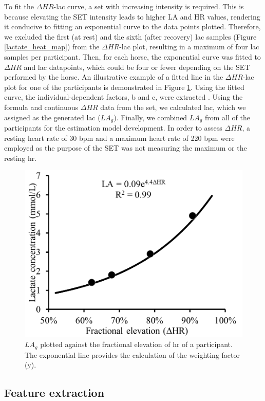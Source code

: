 To fit the $\Delta HR$-\gls{lac} curve, a \gls{set} with increasing intensity is required. This is because elevating the SET intensity leads to higher LA and HR values, rendering it conducive to fitting an exponential curve to the data points plotted. Therefore, we excluded the first (at rest) and the sixth (after recovery) \gls{lac} samples (Figure \ref{lactate_heat_map}) from the $\Delta HR$-\gls{lac} plot, resulting in a maximum of four \gls{lac} samples per participant. Then, for each horse, the exponential curve was fitted to $\Delta HR$ and \gls{lac} datapoints, which could be four or fewer depending on the SET performed by the horse. An illustrative example of a fitted line in the $\Delta HR$-\gls{lac} plot for one of the participants is demonstrated in Figure \ref{deltahr_LA_plot}. Using the fitted curve, the individual-dependent factors, b and c, were extracted \cite{Munsters2020AStudy}. Using the formula and continuous $\Delta HR$ data from the \gls{set}, we calculated \gls{lac}, which we assigned as the generated \gls{lac} ($LA_g$). Finally, we combined $LA_g$ from all of the participants for the estimation model development. In order to assess $\Delta HR$, a resting heart rate of 30 \gls{bpm} and a maximum heart rate of 220 \gls{bpm} were employed \cite{Munsters2020AStudy} as the purpose of the SET was not measuring the maximum or the resting \gls{hr}. 


\begin{figure}[htb]
\centering
\includegraphics[width=.6\linewidth]{chapters/fatigue/figures/Picture4.png}
\caption{$LA_g$ plotted against the fractional elevation of \gls{hr} of a participant. The exponential line provides the calculation of the weighting factor (y).}
\label{deltahr_LA_plot}
\end{figure}


\subsection{Feature extraction}
\label{sec:subsets}

